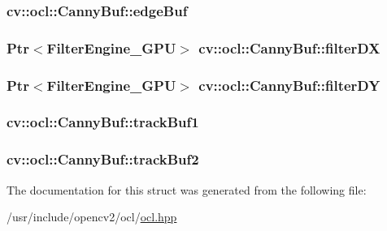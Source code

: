 \hypertarget{structcv_1_1ocl_1_1CannyBuf_ae9db0f2a4e6c10f3e05506bc3eaf6f9f}{
\subsubsection[{edge\-Buf}]{ cv\-::ocl\-::\-Canny\-Buf\-::edge\-Buf}}\label{structcv_1_1ocl_1_1CannyBuf_ae9db0f2a4e6c10f3e05506bc3eaf6f9f}
\hypertarget{structcv_1_1ocl_1_1CannyBuf_a17647415647e9115dea6ff8f0a15c10e}{
\subsubsection[{filter\-D\-X}]{\setlength{\rightskip}{0pt plus 5cm}Ptr$<${\bf Filter\-Engine\-\_\-\-G\-P\-U}$>$ cv\-::ocl\-::\-Canny\-Buf\-::filter\-D\-X}}\label{structcv_1_1ocl_1_1CannyBuf_a17647415647e9115dea6ff8f0a15c10e}
\hypertarget{structcv_1_1ocl_1_1CannyBuf_adc242c792c269cc38ebc2c58da5d7427}{
\subsubsection[{filter\-D\-Y}]{\setlength{\rightskip}{0pt plus 5cm}Ptr$<${\bf Filter\-Engine\-\_\-\-G\-P\-U}$>$ cv\-::ocl\-::\-Canny\-Buf\-::filter\-D\-Y}}\label{structcv_1_1ocl_1_1CannyBuf_adc242c792c269cc38ebc2c58da5d7427}
\hypertarget{structcv_1_1ocl_1_1CannyBuf_ab948679134597d21fc480eb2096bb4bc}{
\subsubsection[{track\-Buf1}]{ cv\-::ocl\-::\-Canny\-Buf\-::track\-Buf1}}\label{structcv_1_1ocl_1_1CannyBuf_ab948679134597d21fc480eb2096bb4bc}
\hypertarget{structcv_1_1ocl_1_1CannyBuf_a4c72991d85b66d28ed115db2ff43f6c0}{
\subsubsection[{track\-Buf2}]{ cv\-::ocl\-::\-Canny\-Buf\-::track\-Buf2}}\label{structcv_1_1ocl_1_1CannyBuf_a4c72991d85b66d28ed115db2ff43f6c0}


The documentation for this struct was generated from the following file\-:\begin{DoxyCompactItemize}
\item 
/usr/include/opencv2/ocl/\hyperlink{ocl_2ocl_8hpp}{ocl.\-hpp}\end{DoxyCompactItemize}
